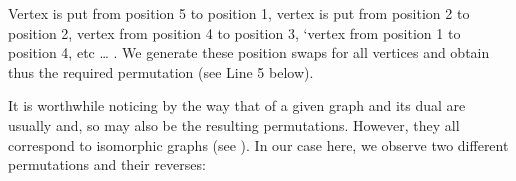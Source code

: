 \documentclass[a4paper,12pt,english]{sphinxhowto}
\begin{document}
Vertex  is put from position 5 to position 1, vertex  is put from position 2 to position 2, vertex  from position 4 to position 3, ‘vertex  from position 1 to position 4, etc … . We generate these position swaps for all vertices and obtain thus the required permutation (see Line 5 below).

\begin{sphinxVerbatim}[commandchars=\\\{\},numbers=left,firstnumber=1,stepnumber=1]
  \PYG{p}{[}    \PYG{p}{]}
   
    \PYG{p}{[}\PYG{p}{[}\PYG{p}{]}\PYG{p}{]}  
\end{sphinxVerbatim}

It is worthwhile noticing by the way that  of a given graph and its dual are usually  and, so may also be the resulting permutations. However, they all correspond to isomorphic graphs (see ). In our case here, we observe two different permutations and their reverses:
\end{document}
